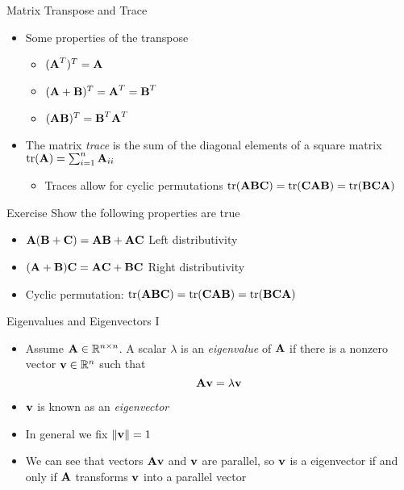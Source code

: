 \documentclass{beamer}
\begin{document}
\begin{frame}{Matrix Transpose and Trace} 
 \begin{itemize} 
  \item Some properties of the transpose  
  \begin{itemize}
  \item $(\textbf{A}^T)^T = \textbf{A}$ 
  \item $(\textbf{A} + \textbf{B})^T = \textbf{A}^T = \textbf{B}^T$ 
  \item $(\textbf{A}\textbf{B})^T = \textbf{B}^T\textbf{A}^T$  
  \end{itemize} 
 \item The matrix \emph{trace} is the sum of the diagonal elements of a square matrix $\mbox{tr}(\textbf{A}) = \sum_{i=1}^n \textbf{A}_{ii}$ 
 \begin{itemize} 
 \item Traces allow for cyclic permutations $\mbox{tr}(\textbf{A}\textbf{B}\textbf{C}) = \mbox{tr}(\textbf{C}\textbf{A}\textbf{B}) = \mbox{tr}(\textbf{B}\textbf{C}\textbf{A})$ 
 \end{itemize}
 \end{itemize}
\end{frame}

\begin{frame}{Exercise} 
Show the following properties are true
\begin{itemize}
 \item $\textbf{A}(\textbf{B} + \textbf{C}) = \textbf{A}\textbf{B} + \textbf{A}\textbf{C}$ Left distributivity 
 \item $(\textbf{A} +\textbf{B}) \textbf{C} = \textbf{A}\textbf{C} +\textbf{B}\textbf{C}$ Right distributivity 
 \item Cyclic permutation: $\mbox{tr}(\textbf{A}\textbf{B}\textbf{C}) = \mbox{tr}(\textbf{C}\textbf{A}\textbf{B}) = \mbox{tr}(\textbf{B}\textbf{C}\textbf{A})$ 
\end{itemize}
\end{frame}

\begin{frame}{Eigenvalues and Eigenvectors I}  
\begin{itemize} 
 \item Assume $\textbf{A} \in \mathbb{R}^{n \times n}$. A scalar $\lambda$ is an \emph{eigenvalue} of $\textbf{A}$ if there is a nonzero vector $\textbf{v} \in \mathbb{R}^n$  such that 
\begin{displaymath}
 \textbf{A}\textbf{v} = \lambda\textbf{v}
\end{displaymath}
\item $\textbf{v}$ is known as an \emph{eigenvector}
 \item In general we fix $\|\textbf{v}\| = 1$ 
 \item We can see that vectors $\textbf{A}\textbf{v}$ and $\textbf{v}$ are parallel, so $\textbf{v}$ is a eigenvector if and only if $\textbf{A}$ transforms $\textbf{v}$ into a parallel vector  
\end{itemize}
\end{frame}
\end{document}
